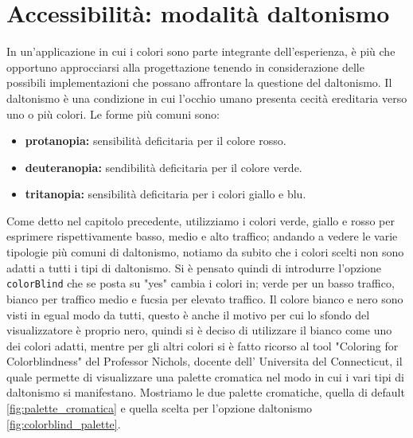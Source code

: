 \documentclass[binding=0.6cm]{sapthesis}
\begin{document}
\section{Accessibilità: modalità daltonismo}
In un'applicazione in cui i colori sono parte integrante dell'esperienza, è più che opportuno approcciarsi alla progettazione tenendo
in considerazione delle possibili implementazioni che possano affrontare la questione del daltonismo. 
Il daltonismo è una condizione in cui l'occhio umano presenta cecità ereditaria verso uno o più colori. Le forme più comuni sono:
\begin{itemize}
    \item \textbf{protanopia:} sensibilità deficitaria per il colore rosso.
    \item \textbf{deuteranopia:} sendibilità deficitaria per il colore verde.
    \item \textbf{tritanopia:} sensibilità deficitaria per i colori giallo e blu.
\end{itemize}
Come detto nel capitolo precedente, utilizziamo
i colori verde, giallo e rosso per esprimere rispettivamente basso, medio e alto traffico; andando a vedere le varie tipologie più comuni di daltonismo, 
notiamo da subito che i colori scelti non sono adatti a tutti i tipi di daltonismo. Si è pensato quindi di introdurre l'opzione
\lstinline|colorBlind| che se posta su "yes" cambia i colori in; verde per un basso traffico, bianco per traffico medio e fucsia per elevato traffico.
Il colore bianco e nero sono visti in egual modo da tutti, questo è anche il motivo per cui lo sfondo del visualizzatore è proprio nero, quindi si è
deciso di utilizzare il bianco come uno dei colori adatti, mentre per gli altri colori si è fatto ricorso al tool "Coloring for Colorblindness" \cite{ColorBlindPalette2024} 
del Professor Nichols, docente dell' Universita del Connecticut, il quale permette di visualizzare una palette cromatica nel modo in cui i vari tipi
di daltonismo si manifestano. Mostriamo le due palette cromatiche, quella di default \ref{fig:palette_cromatica} e quella scelta per l'opzione daltonismo \ref{fig:colorblind_palette}.
\end{document}
